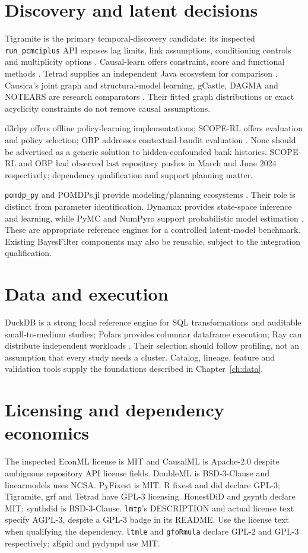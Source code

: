 \section{Discovery and latent decisions}
Tigramite is the primary temporal-discovery candidate: its inspected
\texttt{run\_pcmciplus} API exposes lag limits, link assumptions,
conditioning controls and multiplicity options \citep{sw_tigramite}.
Causal-learn offers constraint, score and functional methods
\citep{causallearn2024,sw_causallearn}. Tetrad supplies an independent Java
ecosystem for comparison \citep{sw_tetrad}. Causica's joint graph and
structural-model learning, gCastle, DAGMA and NOTEARS are research
comparators \citep{sw_causica,sw_gcastle,sw_dagma,sw_notears}.
Their fitted graph distributions or exact acyclicity constraints do not
remove causal assumptions.

d3rlpy offers offline policy-learning implementations; SCOPE-RL offers
evaluation and policy selection; OBP addresses contextual-bandit evaluation
\citep{sw_d3rlpy,sw_scope_rl,sw_obp}. None should be advertised as a
generic solution to hidden-confounded bank histories. SCOPE-RL and OBP
had observed last repository pushes in March and June 2024 respectively;
dependency qualification and support planning matter.

\texttt{pomdp\_py} and POMDPs.jl provide modeling/planning ecosystems
\citep{sw_pomdp_py,sw_pomdps}. Their role is distinct from parameter
identification. Dynamax provides state-space inference and learning,
while PyMC and NumPyro support probabilistic model estimation
\citep{sw_dynamax,sw_pymc,sw_numpyro}. These are appropriate reference
engines for a controlled latent-model benchmark. Existing BayesFilter
components may also be reusable, subject to the integration qualification.

\section{Data and execution}
DuckDB is a strong local reference engine for SQL transformations and
auditable small-to-medium studies; Polars provides columnar dataframe
execution; Ray can distribute independent workloads
\citep{sw_duckdb,sw_polars,sw_ray}. Their selection should follow profiling,
not an assumption that every study needs a cluster.
Catalog, lineage, feature and validation tools supply the foundations
described in Chapter~\ref{ch:data}.

\section{Licensing and dependency economics}
The inspected EconML license is MIT and CausalML is Apache-2.0 despite
ambiguous repository API license fields. DoubleML is BSD-3-Clause and
linearmodels uses NCSA. PyFixest is MIT. R fixest and did declare GPL-3;
Tigramite, grf and Tetrad have GPL-3 licensing. HonestDiD and gsynth
declare MIT; synthdid is BSD-3-Clause.
\texttt{lmtp}'s DESCRIPTION and actual license text specify AGPL-3,
despite a GPL-3 badge in its README. Use the license text when qualifying
the dependency. \texttt{ltmle} and \texttt{gfoRmula} declare GPL-2 and
GPL-3 respectively; zEpid and pydynpd use MIT.

